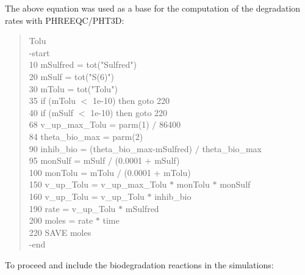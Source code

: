 The above equation was used as a base for the computation 
of the degradation rates with PHREEQC/PHT3D: 

{\color{red}
\begin{quote}
Tolu \\
  -start \\
   10 mSulfred  = tot("Sulfred")  \\
   20 mSulf     = tot("S(6)")  \\
   30 mTolu     = tot("Tolu")  \\
   35 if (mTolu  $<$ 1e-10) then goto 220  \\
   40 if (mSulf  $<$ 1e-10) then goto 220  \\
   68 v\_up\_max\_Tolu = parm(1) $/$ 86400  \\
   84 theta\_bio\_max  = parm(2)  \\
   90 inhib\_bio = (theta\_bio\_max-mSulfred) $/$ theta\_bio\_max  \\
   95 monSulf = mSulf $/$ (0.0001 + mSulf)  \\
  100 monTolu = mTolu $/$ (0.0001 + mTolu)  \\
  150 v\_up\_Tolu = v\_up\_max\_Tolu $*$ monTolu $*$ monSulf  \\
  160 v\_up\_Tolu = v\_up\_Tolu $*$ inhib\_bio \\
  190 rate = v\_up\_Tolu $*$ mSulfred  \\
  200 moles = rate $*$ time  \\
  220 SAVE moles  \\
 -end  \\
\end{quote}
}

To proceed and include the biodegradation reactions in the simulations:

